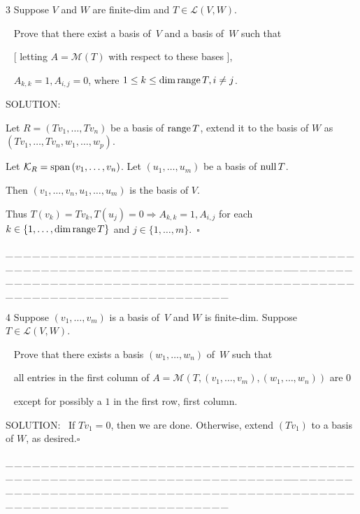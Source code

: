 \documentclass[a4paper, 11pt, UTF8]{article}
\def\range{\textup{range}\,}
\def\null{\textup{null\,}}
\def\Spn{\textup{span}\,}
\def\Lm{\mathcal{L}}
\def\Mt{\mathcal{M}}
\begin{document}
\begin{large}
{\timesbf\Large 3} {\timessl\Large 
Suppose $V$ and $W$ are finite-dim and $T\in\Lm(V, W)$.}\par\,\,\,
{\timessl\Large Prove that there exist a basis of \,$V$ and a basis of \,$W$ such that}\par\,\,\,
[ letting $A=\Mt(T)$ with respect to these bases ],\par\,\,\,
{\timessl\Large $A_{k,k}=1,A_{i,j}=0$, where $1\leq k\leq \dim\range T, i\neq j$.}\par
{\timesbf S\footnotesize{OLUTION:}}\par\quad
Let $R=(Tv_1,\dots,Tv_n)$ be a basis of $\range T$, extend it to the basis of $W$ as $(Tv_1,\dots,Tv_n,w_1,\dots,w_p)$.\par\quad
Let $\mathcal{K}_R=\Spn(v_1,\dots,v_n)$. Let $(u_1,\dots,u_m)$ be a basis of $\null T$.\par\quad
Then $(v_1,\dots,v_n,u_1,\dots,u_m)$ is the basis of $V$.\par\quad
Thus $T(v_k)=Tv_k,T(u_j)=0\Rightarrow A_{k,k}=1,A_{i,j}$ for each $k\in\{1,\dots,\dim\range T\}$ and $j\in\{1,\dots,m\}.\,\,\,\square$\par
{\tiny \_\,\_\,\_\,\_\,\_\,\_\,\_\,\_\,\_\,\_\,\_\,\_\,\_\,\_\,\_\,\_\,\_\,\_\,\_\,\_\,\_\,\_\,\_\,\_\,\_\,\_\,\_\,\_\,\_\,\_\,\_\,\_\,\_\,\_\,\_\,\_\,\_\,\_\,\_\,\_\,\_\,\_\,\_\,\_\,\_\,\_\,\_\,\_\,\_\,\_\,\_\,\_\,\_\,\_\,\_\,\_\,\_\,\_\,\_\,\_\,\_\,\_\,\_\,\_\,\_\,\_\,\_\,\_\,\_\,\_\,\_\_\,\_\,\_\,\_\,\_\,\_\,\_\,\_\,\_\,\_\,\_\,\_\,\_\,\_\,\_\,\_\,\_\,\_\,\_\,\_\,\_\,\_\,\_\,\_\,\_\,\_\,\_\,\_\,\_\,\_\,\_\,\_\,\_\,\_\,\_\,\_\,\_\,\_\,\_\,\_\,\_\,\_\,\_\,\_\,\_\,\_\,\_\,\_\,\_\,\_\,\_\,\_\,\_\,\_\,\_\,\_\,\_\,\_\,\_\,\_\,\_\,\_\,\_\,\_\,\_\,\_\,\_\,\_\,\_\,\_\,\_}\par

{\timesbf\Large 4} {\timessl\Large 
Suppose $(v_1,\dots,v_m)$ is a basis of \,$V$ and $W$ is finite-dim. Suppose $T\in\Lm(V, W)$.}\par\,\,\,
{\timessl\Large Prove that there exists a basis $(w_1,\dots,w_n)$ of \,$W$ such that}\par\,\,\,
{\timessl\Large all entries in the first column of $A=\Mt(T,(v_1,\dots,v_m),(w_1,\dots,w_n))$ are $0$}\par\,\,\,
{\timessl\Large except for possibly a $1$ in the first row, first column.
}\par
{\timesbf S\footnotesize{OLUTION:}}\,\,\,
If $Tv_1=0$, then we are done. Otherwise, extend $(Tv_1)$ to a basis of $W$, as desired.\quad$\square$\par
{\tiny \_\,\_\,\_\,\_\,\_\,\_\,\_\,\_\,\_\,\_\,\_\,\_\,\_\,\_\,\_\,\_\,\_\,\_\,\_\,\_\,\_\,\_\,\_\,\_\,\_\,\_\,\_\,\_\,\_\,\_\,\_\,\_\,\_\,\_\,\_\,\_\,\_\,\_\,\_\,\_\,\_\,\_\,\_\,\_\,\_\,\_\,\_\,\_\,\_\,\_\,\_\,\_\,\_\,\_\,\_\,\_\,\_\,\_\,\_\,\_\,\_\,\_\,\_\,\_\,\_\,\_\,\_\,\_\,\_\,\_\,\_\_\,\_\,\_\,\_\,\_\,\_\,\_\,\_\,\_\,\_\,\_\,\_\,\_\,\_\,\_\,\_\,\_\,\_\,\_\,\_\,\_\,\_\,\_\,\_\,\_\,\_\,\_\,\_\,\_\,\_\,\_\,\_\,\_\,\_\,\_\,\_\,\_\,\_\,\_\,\_\,\_\,\_\,\_\,\_\,\_\,\_\,\_\,\_\,\_\,\_\,\_\,\_\,\_\,\_\,\_\,\_\,\_\,\_\,\_\,\_\,\_\,\_\,\_\,\_\,\_\,\_\,\_\,\_\,\_\,\_\,\_}\par


\end{large}
\end{document}

